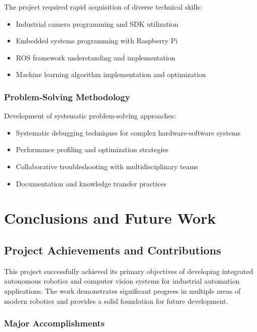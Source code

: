 \documentclass{book}
\begin{document}
\par\noindent The project required rapid acquisition of diverse technical skills:

\begin{itemize}
\item Industrial camera programming and SDK utilization
\item Embedded systems programming with Raspberry Pi
\item ROS framework understanding and implementation
\item Machine learning algorithm implementation and optimization
\end{itemize}

\subsection{Problem-Solving Methodology}

\par\noindent Development of systematic problem-solving approaches:

\begin{itemize}
\item Systematic debugging techniques for complex hardware-software systems
\item Performance profiling and optimization strategies
\item Collaborative troubleshooting with multidisciplinary teams
\item Documentation and knowledge transfer practices
\end{itemize}

\chapter{Conclusions and Future Work}

\section{Project Achievements and Contributions}

\par\noindent This project successfully achieved its primary objectives of developing integrated autonomous robotics and computer vision systems for industrial automation applications. The work demonstrates significant progress in multiple areas of modern robotics and provides a solid foundation for future development.

\subsection{Major Accomplishments}
\end{document}
